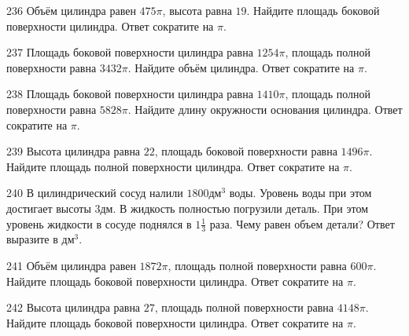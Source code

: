 \documentclass[4apaper]{article}
\begin{document}
\begin{taskBN}{236}
Объём цилиндра равен $475\pi$, высота равна $19$. Найдите площадь боковой поверхности цилиндра. Ответ сократите на $\pi$.
\end{taskBN}

\begin{taskBN}{237}
Площадь боковой поверхности цилиндра равна $1254\pi$, площадь полной поверхности равна $3432\pi$. Найдите объём цилиндра. Ответ сократите на $\pi$.
\end{taskBN}

\begin{taskBN}{238}
Площадь боковой поверхности цилиндра равна $1410\pi$, площадь полной поверхности равна $5828\pi$. Найдите длину окружности основания цилиндра. Ответ сократите на $\pi$.
\end{taskBN}

\begin{taskBN}{239}
Высота цилиндра равна $22$, площадь боковой поверхности равна $1496\pi$. Найдите площадь полной поверхности цилиндра. Ответ сократите на $\pi$.
\end{taskBN}

\begin{taskBN}{240}
В цилиндрический сосуд налили $1800\mbox{дм}^3$ воды. Уровень воды при этом достигает высоты $3$дм. В жидкость полностью погрузили деталь. При этом уровень жидкости в сосуде поднялся в ${1}\frac{1}{3}$ раза. Чему равен объем детали? Ответ выразите в $\mbox{дм}^3$.
\end{taskBN}

\begin{taskBN}{241}
Объём цилиндра равен $1872\pi$, площадь полной поверхности равна $600\pi$. Найдите площадь боковой поверхности цилиндра. Ответ сократите на $\pi$.
\end{taskBN}

\begin{taskBN}{242}
Высота цилиндра равна $27$, площадь полной поверхности равна $4148\pi$. Найдите площадь боковой поверхности цилиндра. Ответ сократите на $\pi$.
\end{taskBN}
\end{document}
